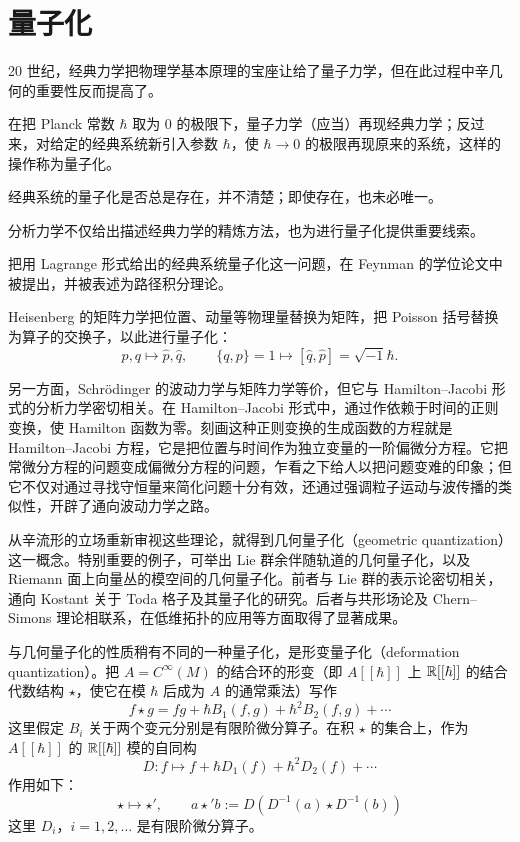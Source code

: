 
\section{量子化}

20 世纪，经典力学把物理学基本原理的宝座让给了量子力学，但在此过程中辛几何的重要性反而提高了。

在把 Planck 常数 $\hbar$ 取为 $0$ 的极限下，量子力学（应当）再现经典力学；反过来，对给定的经典系统新引入参数 $\hbar$，使 $\hbar\to0$ 的极限再现原来的系统，这样的操作称为量子化。

经典系统的量子化是否总是存在，并不清楚；即使存在，也未必唯一。

分析力学不仅给出描述经典力学的精炼方法，也为进行量子化提供重要线索。

把用 Lagrange 形式给出的经典系统量子化这一问题，在 Feynman 的学位论文中被提出，并被表述为路径积分理论。

Heisenberg 的矩阵力学把位置、动量等物理量替换为矩阵，把 Poisson 括号替换为算子的交换子，以此进行量子化：
\begin{equation}
    p,q\mapsto\hat p,\hat q,\qquad \{q,p\}=1\mapsto[\hat q,\hat p]=\sqrt{-1}\hbar. \tag{8.1}
\end{equation}

另一方面，Schrödinger 的波动力学与矩阵力学等价，但它与 Hamilton–Jacobi 形式的分析力学密切相关。在 Hamilton–Jacobi 形式中，通过作依赖于时间的正则变换，使 Hamilton 函数为零。刻画这种正则变换的生成函数的方程就是 Hamilton–Jacobi 方程，它是把位置与时间作为独立变量的一阶偏微分方程。它把常微分方程的问题变成偏微分方程的问题，乍看之下给人以把问题变难的印象；但它不仅对通过寻找守恒量来简化问题十分有效，还通过强调粒子运动与波传播的类似性，开辟了通向波动力学之路。

从辛流形的立场重新审视这些理论，就得到几何量子化（geometric quantization）这一概念。特别重要的例子，可举出 Lie 群余伴随轨道的几何量子化，以及 Riemann 面上向量丛的模空间的几何量子化。前者与 Lie 群的表示论密切相关，通向 Kostant 关于 Toda 格子及其量子化的研究。后者与共形场论及 Chern–Simons 理论相联系，在低维拓扑的应用等方面取得了显著成果。

与几何量子化的性质稍有不同的一种量子化，是形变量子化（deformation quantization）。把 $A=C^\infty(M)$ 的结合环的形变（即 $A[[\hbar]]$ 上 $\mathbb{R}[[\hbar]]$ 的结合代数结构 $\star$，使它在模 $\hbar$ 后成为 $A$ 的通常乘法）写作
\begin{equation}
    f\star g=fg+\hbar B_1(f,g)+\hbar^2B_2(f,g)+\cdots \tag{8.2}
\end{equation}
这里假定 $B_i$ 关于两个变元分别是有限阶微分算子。在积 $\star$ 的集合上，作为 $A[[\hbar]]$ 的 $\mathbb{R}[[\hbar]]$ 模的自同构
\begin{equation}
    D\colon f\mapsto f+\hbar D_1(f)+\hbar^2D_2(f)+\cdots \tag{8.3}
\end{equation}
作用如下：
\begin{equation}
    \star\mapsto\star',\qquad a\star' b:=D\left(D^{-1}(a)\star D^{-1}(b)\right) \tag{8.4}
\end{equation}
这里 $D_i$，$i=1,2,\dots$ 是有限阶微分算子。

